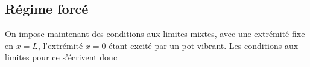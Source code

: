 \documentclass[12pt,fancy]{cours}
\begin{document}


 \subsection{Régime forcé}
On impose maintenant des conditions aux limites mixtes, avec une extrémité fixe en $x=L$, l’extrémité $x=0$ étant excité par un pot vibrant. Les conditions aux limites pour ce  s’écrivent donc 
\end{document}
